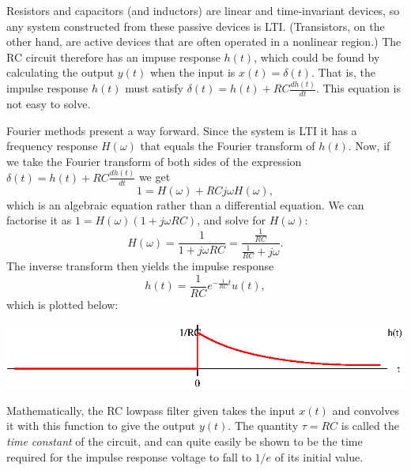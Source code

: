 \documentclass[10pt]{beamer}
\begin{document}
Resistors and capacitors (and inductors) are linear and time-invariant devices, so any system constructed from these passive devices is LTI.  (Transistors, on the other hand, are active devices that are often operated in a nonlinear region.)  The RC circuit therefore has an impuse response $h(t)$, which could be found by calculating the output $y(t)$ when the input is $x(t) = \delta(t)$.  That is, the impulse response $h(t)$ must satisfy $\delta(t) = h(t) + RC \frac{dh(t)}{dt}$.  This equation is not easy to solve.

Fourier methods present a way forward.  Since the system is LTI it has a frequency response $H(\omega)$ that equals the Fourier transform of $h(t)$.  Now, if we take the Fourier transform of both sides of the expression $\delta(t) = h(t) + RC \frac{dh(t)}{dt}$ we get
\begin{equation*}
  1 = H(\omega) + RC j \omega H(\omega),
\end{equation*}
which is an algebraic equation rather than a differential equation.  We can factorise it as $1 = H(\omega)(1 + j \omega RC)$, and solve for $H(\omega)$:
\begin{equation*}
  H(\omega) = \frac{1}{1 + j \omega RC} = \frac{\frac{1}{RC}}{\frac{1}{RC} + j \omega}.
\end{equation*}
The inverse transform then yields the impulse response
\begin{equation*}
  h(t) = \frac{1}{RC} e^{-\frac{1}{RC} t} u(t),
\end{equation*}
which is plotted below:
\begin{center}
  \includegraphics{circuitrclpir}
\end{center}
Mathematically, the RC lowpass filter given takes the input $x(t)$ and convolves it with this function to give the output $y(t)$.  The quantity $\tau = RC$ is called the {\em time constant} of the circuit, and can quite easily be shown to be the time required for the impulse response voltage to fall to $1/e$ of its initial value.  
\end{document}
